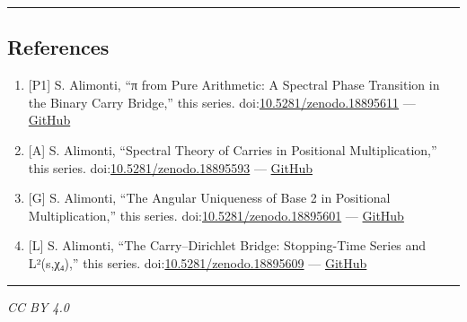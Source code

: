 \documentclass[
  11pt,
]{article}
\providecommand{\tightlist}{%
  \setlength{\itemsep}{0pt}\setlength{\parskip}{0pt}}
\begin{document}
\begin{center}\rule{0.5\linewidth}{0.5pt}\end{center}

\newpage

\subsection{References}\label{references}

\begin{enumerate}
\def\labelenumi{\arabic{enumi}.}
\tightlist
\item
  {[}P1{]} S. Alimonti, ``π from Pure Arithmetic: A Spectral Phase Transition in
  the Binary Carry Bridge,'' this series.
  doi:\href{https://doi.org/10.5281/zenodo.18895611}{10.5281/zenodo.18895611}
  ---
  \href{https://github.com/stefanoalimonti/carry-arithmetic-P1-pi-spectral}{GitHub}
\item
  {[}A{]} S. Alimonti, ``Spectral Theory of Carries in Positional
  Multiplication,'' this series.
  doi:\href{https://doi.org/10.5281/zenodo.18895593}{10.5281/zenodo.18895593}
  ---
  \href{https://github.com/stefanoalimonti/carry-arithmetic-A-spectral-theory}{GitHub}
\item
  {[}G{]} S. Alimonti, ``The Angular Uniqueness of Base 2 in Positional
  Multiplication,'' this series.
  doi:\href{https://doi.org/10.5281/zenodo.18895601}{10.5281/zenodo.18895601}
  ---
  \href{https://github.com/stefanoalimonti/carry-arithmetic-G-angular-uniqueness}{GitHub}
\item
  {[}L{]} S. Alimonti, ``The Carry--Dirichlet Bridge: Stopping-Time Series and
  L²(s,χ₄),'' this series.
  doi:\href{https://doi.org/10.5281/zenodo.18895609}{10.5281/zenodo.18895609}
  ---
  \href{https://github.com/stefanoalimonti/carry-arithmetic-L-dirichlet-bridge}{GitHub}
\end{enumerate}

\begin{center}\rule{0.5\linewidth}{0.5pt}\end{center}

\emph{CC BY 4.0}
\end{document}

